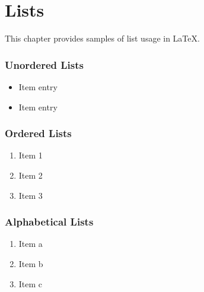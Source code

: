 

\chapter{Lists} \label{lists}

This chapter provides samples of list usage in LaTeX.

\subsection{Unordered Lists} \label{unordered-lists}

\begin{itemize}
	\item Item entry
	\item Item entry
\end{itemize}

\subsection{Ordered Lists} \label{ordered-lists}

\begin{enumerate}
	\item Item 1
	\item Item 2
	\item Item 3
\end{enumerate}

\subsection{Alphabetical Lists} \label{alphabetical-list}

\begin{enumerate}[label=(\alph*)]
	\item Item a
	\item Item b
	\item Item c
\end{enumerate}
